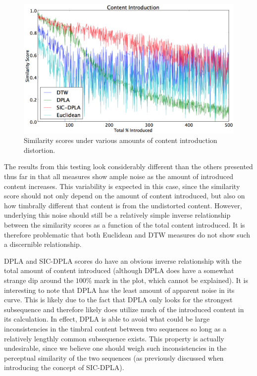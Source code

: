 \documentclass[a4paper,12pt]{report} 	%
\numberwithin{figure}{chapter}
\numberwithin{table}{chapter}
\numberwithin{equation}{chapter}
\begin{document}
\begin{flushleft}
\begin{figure}[h!]
\begin{center}
\includegraphics[scale=0.5,width=\linewidth]{ContentIntroduction}
\caption[Content Introduction Results]{Similarity scores under various amounts of content introduction distortion.}
\end{center}
\end{figure}
The results from this testing look considerably different than the others presented thus far in that all measures show ample noise as the amount of introduced content increases. This variability is expected in this case, since the similarity score should not only depend on the amount of content introduced, but also on how timbrally different that content is from the undistorted content. However, underlying this noise should still be a relatively simple inverse relationship between the similarity scores as a function of the total content introduced. It is therefore problematic that both Euclidean and DTW measures do not show such a discernible relationship.

DPLA and SIC-DPLA scores do have an obvious inverse relationship with the total amount of content introduced (although DPLA does have a somewhat strange dip around the $100\%$ mark in the plot, which cannot be explained). It is interesting to note that DPLA has the least amount of apparent noise in its curve. This is likely due to the fact that DPLA only looks for the strongest subsequence and therefore likely does utilize much of the introduced content in its calculation. In effect, DPLA is able to avoid what could be large inconsistencies in the timbral content between two sequences so long as a relatively lengthly common subsequence exists. This property is actually undesirable, since we believe one should weigh such inconsistencies in the perceptual similarity of the two sequences (as previously discussed when introducing the concept of SIC-DPLA).


\end{flushleft}
\end{document}
